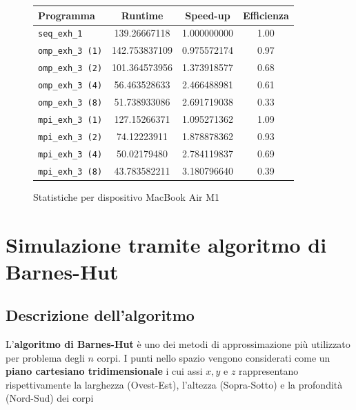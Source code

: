 \documentclass[12pt]{report}
\begin{document}
    \begin{figure}[H]
        \centering

        \begin{tabular}{ l | c | c | c }
            \textbf{Programma} & \textbf{Runtime} & \textbf{Speed-up} & \textbf{Efficienza}\\
            \hline
            \texttt{seq\_exh\_1} & 139.26667118 & 1.000000000 & 1.00 \\
            \hline
            \texttt{omp\_exh\_3 (1)} & 142.753837109 & 0.975572174 & 0.97 \\
            \texttt{omp\_exh\_3 (2)} & 101.364573956 & 1.373918577 & 0.68 \\
            \texttt{omp\_exh\_3 (4)} & 56.463528633 & 2.466488981 & 0.61 \\
            \texttt{omp\_exh\_3 (8)} & 51.738933086 & 2.691719038 & 0.33 \\
            \hline
            \texttt{mpi\_exh\_3 (1)} & 127.15266371 & 1.095271362 & 1.09 \\
            \texttt{mpi\_exh\_3 (2)} & 74.12223911 & 1.878878362 & 0.93 \\
            \texttt{mpi\_exh\_3 (4)} & 50.02179480 & 2.784119837 & 0.69 \\
            \texttt{mpi\_exh\_3 (8)} & 43.783582211 & 3.180796640 & 0.39 \\
        \end{tabular}
        \caption{Statistiche per dispositivo MacBook Air M1}
        \label{fig:stats_m1_1}
    \end{figure}


    \chapter{Simulazione tramite algoritmo di Barnes-Hut}

    \section{Descrizione dell'algoritmo}

    L'\textbf{algoritmo di Barnes-Hut} è uno dei metodi di approssimazione più utilizzato per problema degli $n$ corpi. I punti nello spazio vengono considerati come un \textbf{piano cartesiano tridimensionale} i cui assi $x,y$ e $z$ rappresentano rispettivamente la larghezza (Ovest-Est), l'altezza (Sopra-Sotto) e la profondità (Nord-Sud) dei corpi
        
\end{document}
